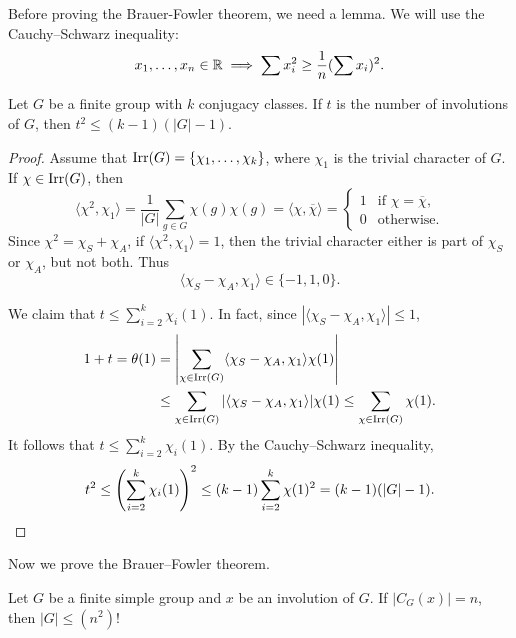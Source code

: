 Before proving the Brauer-Fowler theorem, we
need a lemma. We will use the Cauchy--Schwarz inequality: 
\[
x_1,\dots,x_n\in\mathbb{R}\implies
\sum x_i^2\geq\frac{1}{n}(\sum x_i)^2.
\]

\begin{lemma}
    Let $G$ be a finite group with $k$ conjugacy classes. 
    If $t$ is the number of involutions of $G$, then
    $t^2\leq (k-1)(|G|-1)$. 
\end{lemma}

\begin{proof}
    Assume that $\operatorname{Irr}(G)=\{\chi_1,\dots,\chi_k\}$, where $\chi_1$ is the
    trivial character of $G$. 
    If $\chi\in\operatorname{Irr}(G)$, then 
    \[
        \langle\chi^2,\chi_1\rangle=\frac{1}{|G|}\sum_{g\in G}\chi(g)\chi(g)=\langle\chi,\overline{\chi}\rangle=\begin{cases}
        1 & \text{if $\chi=\overline{\chi}$},\\
        0 & \text{otherwise}.
        \end{cases}
    \]
    Since $\chi^2=\chi_S+\chi_A$, if $\langle\chi^2,\chi_1\rangle=1$, then
    the trivial character either is part of $\chi_S$ or $\chi_A$, but not both. 
    Thus
    \[
    \langle\chi_S-\chi_A,\chi_1\rangle\in\{-1,1,0\}.
    \]
    
    We claim that 
    $t\leq\sum_{i=2}^k\chi_i(1)$. In fact, since 
    $|\langle\chi_S-\chi_A,\chi_1\rangle|\leq 1$, 
    \begin{align*}
        1+t=\theta(1)
        &=\left|\sum_{\chi\in\operatorname{Irr}(G)}\langle\chi_S-\chi_A,\chi_1\rangle\chi(1)\right|\\
        &\leq\sum_{\chi\in\operatorname{Irr}(G)}|\langle\chi_S-\chi_A,\chi_1\rangle|\chi(1)
        \leq\sum_{\chi\in\operatorname{Irr}(G)}\chi(1).
    \end{align*}
    It follows that $t\leq\sum_{i=2}^k\chi_i(1)$. 
    By the Cauchy--Schwarz inequality, 
    \[
        t^2\leq\left(\sum_{i=2}^k\chi_i(1)\right)^2
        \leq(k-1)\sum_{i=2}^k\chi(1)^2=(k-1)(|G|-1).\qedhere
    \]
\end{proof}

Now we prove the Brauer--Fowler theorem. 

\begin{theorem}
    Let $G$ be a finite simple group and $x$ be an involution of $G$. If $|C_G(x)|=n$, then $|G|\leq (n^2)!$	
\end{theorem}

